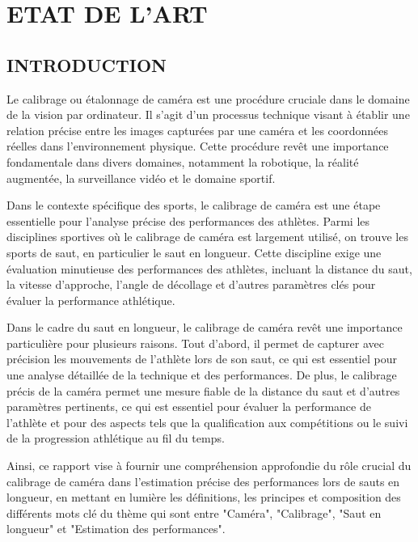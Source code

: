 \chapter{ETAT DE L'ART}
\begin{spacing}{1.2}
\minitoc
\thispagestyle{MyStyle}
\end{spacing}
\newpage

\section{INTRODUCTION}


Le calibrage ou étalonnage de caméra est une procédure cruciale dans le domaine de la vision par ordinateur. Il s'agit d'un processus technique visant à établir une relation précise entre les images capturées par une caméra et les coordonnées réelles dans l'environnement physique. Cette procédure revêt une importance fondamentale dans divers domaines, notamment la robotique, la réalité augmentée, la surveillance vidéo et le domaine sportif.

Dans le contexte spécifique des sports, le calibrage de caméra est une étape essentielle pour l'analyse précise des performances des athlètes. Parmi les disciplines sportives où le calibrage de caméra est largement utilisé, on trouve les sports de saut, en particulier le saut en longueur. Cette discipline exige une évaluation minutieuse des performances des athlètes, incluant la distance du saut, la vitesse d'approche, l'angle de décollage et d'autres paramètres clés pour évaluer la performance athlétique.

Dans le cadre du saut en longueur, le calibrage de caméra revêt une importance particulière pour plusieurs raisons. Tout d'abord, il permet de capturer avec précision les mouvements de l'athlète lors de son saut, ce qui est essentiel pour une analyse détaillée de la technique et des performances. De plus, le calibrage précis de la caméra permet une mesure fiable de la distance du saut et d'autres paramètres pertinents, ce qui est essentiel pour évaluer la performance de l'athlète et pour des aspects tels que la qualification aux compétitions ou le suivi de la progression athlétique au fil du temps.

Ainsi, ce rapport vise à fournir une compréhension approfondie du rôle crucial du calibrage de caméra dans l'estimation précise des performances lors de sauts en longueur, en mettant en lumière les définitions, les principes et composition des différents mots clé du thème qui sont entre "Caméra", "Calibrage", "Saut en longueur" et "Estimation des performances".  




